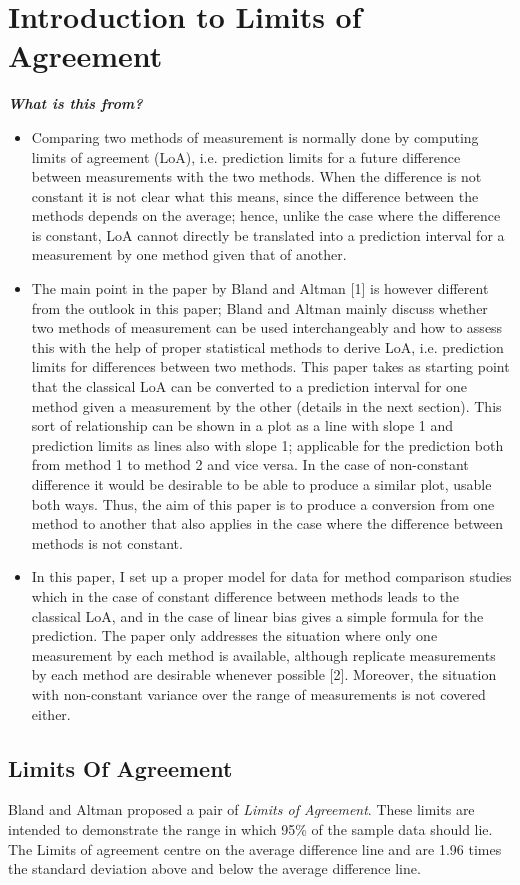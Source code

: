\documentclass[Main.tex]{subfiles}
\begin{document}
\section{Introduction to Limits of Agreement}
\textit{\textbf{What is this from?}}
\begin{itemize}
		\item Comparing two methods of measurement is normally done by computing limits of agreement (LoA), i.e. prediction limits for
		a future difference between measurements with the two methods. When the difference is not constant it is not clear what
		this means, since the difference between the methods depends on the average; hence, unlike the case where the difference is
		constant, LoA cannot directly be translated into a prediction interval for a measurement by one method given that of another.
		\item The main point in the paper by Bland and Altman [1] is however different from the outlook in this paper; Bland and Altman
		mainly discuss whether two methods of measurement can be used interchangeably and how to assess this with the help of
		proper statistical methods to derive LoA, i.e. prediction limits for differences between two methods.
		This paper takes as starting point that the classical LoA can be converted to a prediction interval for one method given a
		measurement by the other (details in the next section). This sort of relationship can be shown in a plot as a line with slope 1
		and prediction limits as lines also with slope 1; applicable for the prediction both from method 1 to method 2 and vice versa. In
		the case of non-constant difference it would be desirable to be able to produce a similar plot, usable both ways. Thus, the aim
		of this paper is to produce a conversion from one method to another that also applies in the case where the difference between
		methods is not constant.
		\item In this paper, I set up a proper model for data for method comparison studies which in the case of constant difference between
		methods leads to the classical LoA, and in the case of linear bias gives a simple formula for the prediction. The paper only
		addresses the situation where only one measurement by each method is available, although replicate measurements by each
		method are desirable whenever possible [2]. Moreover, the situation with non-constant variance over the range of measurements
		is not covered either.
\end{itemize}
	\subsection{Limits Of Agreement}
	Bland and Altman proposed a pair of \textit{Limits of Agreement}. These
	limits are intended to demonstrate the range in which 95\% of the
	sample data should lie. The Limits of agreement centre on the
	average difference line and are 1.96 times the standard deviation
	above and below the average difference line.
\end{document}
